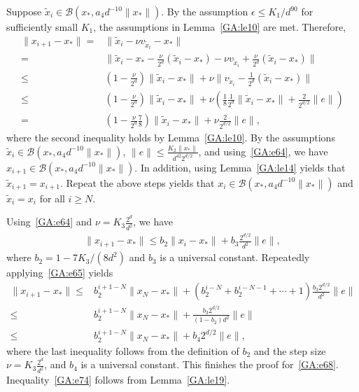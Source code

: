 \begin{enumerate}
Suppose $\tilde{x}_i \in \mathcal{B}(x_*, a_4 d^{-10} \|x_*\|)$. By the assumption $\epsilon \leq K_1 / d^{90}$ for sufficiently small $K_1$, the assumptions in Lemma~\ref{GA:le10} are met. Therefore,
\begin{align}
\|x_{i + 1} - x_*\|
=& \|\tilde{x}_i - \nu {v}_{\tilde{x}_i} - x_*\|   \nonumber \\
=& \|\tilde{x}_i - x_*  -  \frac{\nu}{2^d} (\tilde{x}_i - x_*) - \nu {v}_{\tilde{x}_i} + \frac{\nu}{2^d} (\tilde{x}_i - x_*) \| \nonumber \\
\leq& \left( 1 - \frac{\nu}{2^d} \right) \|\tilde{x}_i - x_*\| + \nu \|{v}_{\tilde{x}_i} - \frac{1}{2^d} (\tilde{x}_i - x_*)\| \nonumber \\
\leq& \left( 1 - \frac{\nu}{2^d} \right) \|\tilde{x}_i - x_*\| + \nu \left( \frac{1}{8} \frac{1}{2^d} \|\tilde{x}_i - x_*\| + \frac{2}{2^{d/2}} \|e\| \right) \nonumber \\
=& \left( 1 - \frac{\nu}{2^d} \frac{7}{8} \right) \|\tilde{x}_i - x_*\| + \nu \frac{2}{2^{d/2}} \|e\|, \label{GA:e64}
\end{align}
where the second inequality holds by Lemma~\ref{GA:le10}.
By the assumptions $\tilde{x}_i \in \mathcal{B}(x_*, a_4 d^{-10} \|x_*\|)$, $\|e\| \leq \frac{K_2 \|x_*\| }{d^{42} 2^{d/2} }$, and using~\eqref{GA:e64}, we have $x_{i + 1} \in \mathcal{B}(x_*, a_4 d^{-10} \|x_*\|)$. In addition, using Lemma~\ref{GA:le14} yields that $\tilde{x}_{i + 1} = x_{i+1}$. Repeat the above steps yields that $x_i \in \mathcal{B}(x_*, a_4 d^{-10} \|x_*\|)$ and $\tilde{x}_i = x_i$ for all $ i \geq N$.

Using~\eqref{GA:e64} and $\nu = K_3 \frac{2^d}{d^2}$, we have
\begin{align} \label{GA:e65}
\|x_{i + 1} - x_*\|\leq b_2 \|x_i - x_*\| + b_3 \frac{2^{d/2}}{d^2} \|e\|,
\end{align}
where $b_2 = 1 - 7 K_3 / (8 d^2)$ and $b_3$ is a universal constant. Repeatedly applying~\eqref{GA:e65} yields
\begin{align*}
\|x_{i + 1} - x_*\| \leq& b_2^{i + 1 - N} \|x_N - x_*\| + (b_2^{i-N} + b_2^{i - N - 1} + \cdots + 1) \frac{b_3 2^{d/2}}{d^2} \|e\| \\
\leq& b_2^{i + 1 - N} \|x_N - x_*\| + \frac{b_3 2^{d/2}}{(1 - b_2) d^2} \|e\| \\
\leq& b_2^{i + 1 - N} \|x_N - x_*\| + b_4 2^{d/2} \|e\|,
\end{align*}
where the last inequality follows from the definition of $b_2$ and the step size $\nu = K_3 \frac{2^d}{d^2}$, and $b_4$ is a universal constant. This finishes the proof for~\eqref{GA:e68}. Inequality~\eqref{GA:e74} follows from Lemma~\ref{GA:le19}.
\end{enumerate}

